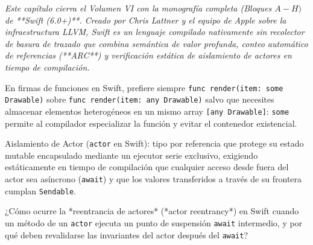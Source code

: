 \documentclass{book}
\begin{document}
\noindent\textit{Este capítulo cierra el Volumen VI con la monografía completa (Bloques \(A-H)\) de **Swift (6.0+)**. Creado por Chris Lattner y el equipo de Apple sobre la infraestructura LLVM, Swift es un lenguaje compilado nativamente sin recolector de basura de trazado que combina semántica de valor profunda, conteo automático de referencias (**ARC**) y verificación estática de aislamiento de actores en tiempo de compilación.}

\begin{tcolorbox}[title={Consejo}, studiumtip, breakable]

En firmas de funciones en Swift, prefiere siempre \texttt{func render(item: some Drawable)} sobre \texttt{func render(item: any Drawable)} salvo que necesites almacenar elementos heterogéneos en un mismo array \texttt{[any Drawable]}: \texttt{some} permite al compilador especializar la función y evitar el contenedor existencial.
\end{tcolorbox}

\begin{tcolorbox}[title={Definición}, studiumdef, breakable]

Aislamiento de Actor (\texttt{actor} en Swift): tipo por referencia que protege su estado mutable encapsulado mediante un ejecutor serie exclusivo, exigiendo estáticamente en tiempo de compilación que cualquier acceso desde fuera del actor sea asíncrono (\texttt{await}) y que los valores transferidos a través de su frontera cumplan \texttt{Sendable}.
\end{tcolorbox}

\begin{tcolorbox}[title={Autoficha}, studiumcheck, breakable]

¿Cómo ocurre la *reentrancia de actores* (*actor reentrancy*) en Swift cuando un método de un \texttt{actor} ejecuta un punto de suspensión \texttt{await} intermedio, y por qué deben revalidarse las invariantes del actor después del \texttt{await}?
\end{tcolorbox}
\end{document}
